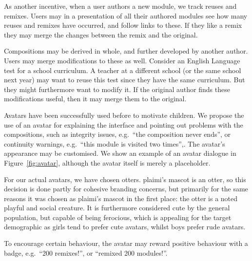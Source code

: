 As another incentive, when a user authors a new module, we track reuses and 
remixes. Users may in a presentation of all their authored modules see how 
many reuses and remixes have occurred, and follow links to these. If they like 
a remix they may merge the changes between the remix and the original.

Compositions may be derived in whole, and further developed by another author. 
Users may merge modifications to these as well. Consider an English Language 
test for a school curriculum. A teacher at a different school (or the same 
school next year) may want to reuse this test since they have the same 
curriculum. But they might furthermore want to modify it. If the original 
author finds these modifications useful, then it may merge them to the 
original.

Avatars have been successfully used before to motivate 
children\cite{gossen2012search}. We propose the use of an avatar for 
explaining the interface and pointing out problems with the compositions, such 
as integrity issues, e.g.\ ``the composition never ends'', or continuity 
warnings, e.g.\ ``this module is visited two times'',. The avatar's appearance 
may be customised. We show an example of an avatar dialogue in 
Figure~\ref{fig:avatar}, although the avatar itself is merely a placeholder.

For our actual avatars, we have chosen otters. plaimi's mascot is an otter, so 
this decision is done partly for cohesive branding concerns, but primarily for 
the same reasons it was chosen as plaimi's mascot in the first place: the 
otter is a noted playful and social creature\cite{gordon1908otter}. It is 
furthermore considered cute by the general population, but capable of being 
ferocious\cite{belanger2011review}, which is appealing for the target 
demographic as girls tend to prefer cute avatars, whilst boys prefer rude 
avatars\cite{inal2006children}.

To encourage certain behaviour, the avatar may reward positive behaviour with 
a badge, e.g.\ ``200 remixes!'', or ``remixed 200 modules!''.

